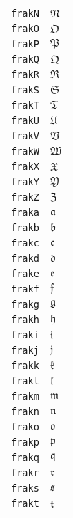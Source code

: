 \begin{longtable}{ll}
\texttt{frakN}&${}{\mathfrak{N}} {}$\\
\texttt{frakO}&${}{\mathfrak{O}} {}$\\
\texttt{frakP}&${}{\mathfrak{P}} {}$\\
\texttt{frakQ}&${}{\mathfrak{Q}} {}$\\
\texttt{frakR}&${}{\mathfrak{R}} {}$\\
\texttt{frakS}&${}{\mathfrak{S}} {}$\\
\texttt{frakT}&${}{\mathfrak{T}} {}$\\
\texttt{frakU}&${}{\mathfrak{U}} {}$\\
\texttt{frakV}&${}{\mathfrak{V}} {}$\\
\texttt{frakW}&${}{\mathfrak{W}} {}$\\
\texttt{frakX}&${}{\mathfrak{X}} {}$\\
\texttt{frakY}&${}{\mathfrak{Y}} {}$\\
\texttt{frakZ}&${}{\mathfrak{Z}} {}$\\
\texttt{fraka}&${}{\mathfrak{a}} {}$\\
\texttt{frakb}&${}{\mathfrak{b}} {}$\\
\texttt{frakc}&${}{\mathfrak{c}} {}$\\
\texttt{frakd}&${}{\mathfrak{d}} {}$\\
\texttt{frake}&${}{\mathfrak{e}} {}$\\
\texttt{frakf}&${}{\mathfrak{f}} {}$\\
\texttt{frakg}&${}{\mathfrak{g}} {}$\\
\texttt{frakh}&${}{\mathfrak{h}} {}$\\
\texttt{fraki}&${}{\mathfrak{i}} {}$\\
\texttt{frakj}&${}{\mathfrak{j}} {}$\\
\texttt{frakk}&${}{\mathfrak{k}} {}$\\
\texttt{frakl}&${}{\mathfrak{l}} {}$\\
\texttt{frakm}&${}{\mathfrak{m}} {}$\\
\texttt{frakn}&${}{\mathfrak{n}} {}$\\
\texttt{frako}&${}{\mathfrak{o}} {}$\\
\texttt{frakp}&${}{\mathfrak{p}} {}$\\
\texttt{frakq}&${}{\mathfrak{q}} {}$\\
\texttt{frakr}&${}{\mathfrak{r}} {}$\\
\texttt{fraks}&${}{\mathfrak{s}} {}$\\
\texttt{frakt}&${}{\mathfrak{t}} {}$\\

\end{longtable}
